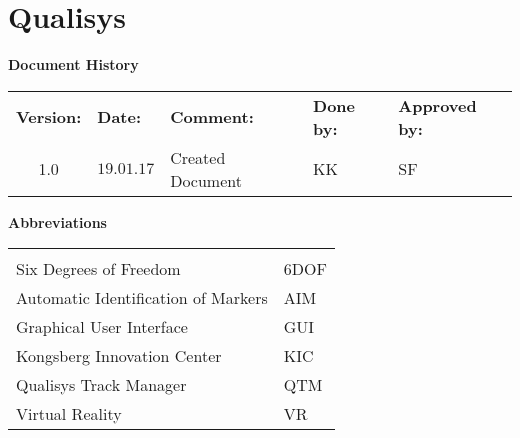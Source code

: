 \chapter{Qualisys}
\label{app:QTM}

\begin{center}
\textbf{\large Document History}\\
\begin{tabular}{cllll}
\rowcolor{cadetgrey}
\textbf{Version:}    &\textbf{Date:} 	 &\textbf{Comment:}    &\textbf{Done by:}   &\textbf{Approved by:}  \\
1.0       & $19.01.17$   & Created Document  & KK    & SF   

\end{tabular}                     
\end{center}

\vspace*{2.0 cm}


\begin{center}
\textbf{\large Abbreviations}\\
\begin{tabular}{ll}
\rowcolor{cadetgrey}
    &   \\
Six Degrees of Freedom      & 6DOF          \\\rowcolor{gainsboro}
Automatic  Identification  of  Markers   & AIM \\
Graphical User Interface       & GUI
\\\rowcolor{gainsboro}
Kongsberg Innovation Center   & KIC \\
Qualisys Track Manager      & QTM         
\\\rowcolor{gainsboro}
Virtual Reality     & VR   \\
\end{tabular}                                                             
\end{center}
\newpage



%





\\




%

%


%


